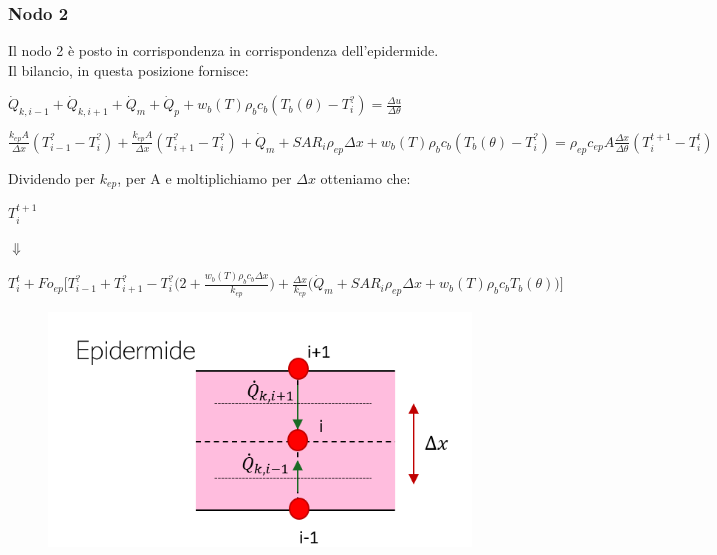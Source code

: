 \subsubsection*{Nodo 2}
Il nodo 2 è posto in corrispondenza in corrispondenza dell'epidermide.\\Il bilancio, in questa posizione fornisce:
\begin{center}
	$ \Dot{Q} _{k, i-1} +\Dot{Q} _{k, i+1}+ \Dot{Q} _{m} +\Dot{Q} _{p}+ w_b (T) \rho _b c_b (T_b(\theta)-T_i ^?)= \frac{\Delta u}{\Delta \theta} $
\end{center}
\vspace{0.15cm}
\begin{center}
	$ \frac{k_{ep} A }{\Delta x}(T_{i-1} ^? - T_i ^? ) + \frac{k_{ep} A }{\Delta x}(T_{i+1} ^? - T_i ^? )+ \Dot{Q} _{m} + SAR_i \rho _{ep} \Delta x  + w_b (T) \rho _b c_b (T_b(\theta)-T_i ^?) = \rho _{ep} c_{ep} A \frac{\Delta x}{ \Delta \theta}(T_i ^{t+1} - T_i ^t )$
\end{center}
\newpage
\noindent
Dividendo per $k_{ep}$, per A e moltiplichiamo per $\Delta x$ otteniamo che:
\begin{center}
	$T_i ^{t+1} $
\end{center}
\begin{center}
	$\Downarrow$
\end{center}
\begin{center}
	$T_i ^t + Fo_{ep} \Bigg[ T_{i-1} ^? + T_{i+1} ^?- T_i ^? \Big(2 + \frac{ w_b (T) \rho _b c_b \Delta x }{k_{ep}} \Big) +  \frac{\Delta x }{k_{ep}} \Big(\Dot{Q} _{m} +  SAR_i \rho _{ep} \Delta x + w_b (T) \rho _b c_b T_b(\theta)\Big) \Bigg]$
\end{center}
\begin{figure}[H]
    \centering
    \includegraphics[width=.6\textwidth]{Immagini/Nodi/nodo2.png} 
    \label{nodo2}
\end{figure}



